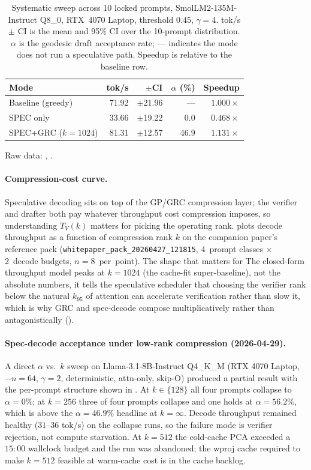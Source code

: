 \documentclass[11pt]{article}
\begin{document}
\begin{table}[h]\centering\small
\caption{Systematic sweep across 10 locked prompts, SmolLM2-135M-Instruct
Q8\_0, RTX~4070 Laptop, threshold $0.45$, $\gamma{=}4$.
tok/s $\pm$ CI is the mean and 95\% CI over the 10-prompt distribution.
$\alpha$ is the geodesic draft acceptance rate; --- indicates the mode
does not run a speculative path.  Speedup is relative to the baseline row.}
\label{tab:sweep-smollm2}
\begin{tabular}{@{}lrrrr@{}}
\toprule
Mode & tok/s & $\pm$CI & $\alpha$ (\%) & Speedup \\
\midrule
Baseline (greedy)  & 71.92 & $\pm$21.96 & ---  & $1.000\times$ \\
SPEC only          & 33.66 & $\pm$19.22 & 0.0  & $0.468\times$ \\
SPEC+GRC ($k{=}1024$) & 81.31 & $\pm$12.57 & 46.9 & $1.131\times$ \\
\bottomrule
\end{tabular}
\end{table}

Raw data: ,
.

\paragraph{Compression-cost curve.}
Speculative decoding sits on top of the GP/GRC compression layer; the
verifier and drafter both pay whatever throughput cost compression imposes,
so understanding $T_V(k)$ matters for picking the operating rank.
 plots decode throughput as a function of
compression rank $k$ on the companion paper's reference pack
(\texttt{whitepaper\_pack\_20260427\_121815}, 4~prompt classes $\times$
2~decode budgets, $n{=}8$~per~point).  The shape that matters for
The closed-form throughput model peaks at $k{=}1024$ (the cache-fit super-baseline),
not the absolute numbers, it tells the speculative scheduler that
choosing the verifier rank below the natural $k_{95}$ of attention can
accelerate verification rather than slow it, which is why GRC and
spec-decode compose multiplicatively rather than antagonistically
().

\paragraph{Spec-decode acceptance under low-rank compression
(2026-04-29).}  A direct $\alpha$ vs.\ $k$ sweep on Llama-3.1-8B-Instruct
Q4\_K\_M (RTX 4070 Laptop, $-n{=}64$, $\gamma{=}2$, deterministic, attn-only,
skip-O) produced a partial result with the per-prompt structure shown in
. At $k{\in}\{128\}$ all four prompts collapse
to $\alpha{=}0\%$; at $k{=}256$ three of four prompts collapse and one
holds at $\alpha{=}56.2\%$, which is above the $\alpha{=}46.9\%$ headline
at $k{=}\infty$. Decode throughput remained healthy ($31$--$36$ tok/s)
on the collapse runs, so the failure mode is verifier rejection, not
compute starvation. At $k{=}512$ the cold-cache PCA exceeded a
$15{:}00$ wallclock budget and the run was abandoned; the wproj cache
required to make $k{=}512$ feasible at warm-cache cost is in the cache
backlog.
\end{document}

